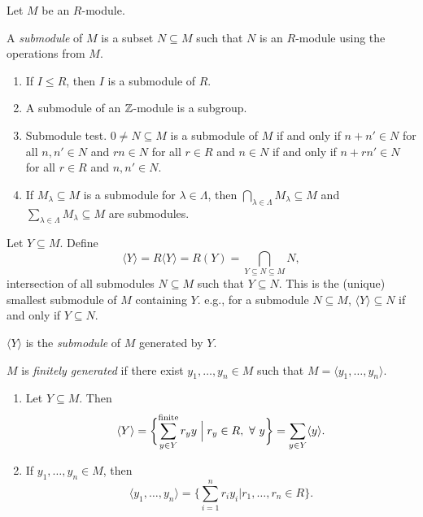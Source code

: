 \noindent Let $M$ be an $R$-module. 

\begin{definition}\label{5.3}
    A \emph{submodule} of $M$ is a subset $N \subseteq M$ such that $N$ is an $R$-module using the operations from $M$.
\end{definition}

\begin{example}\label{5.4}
    \begin{enumerate}
        \item If $I \leq R$, then $I$ is a submodule of $R$.
        \item A submodule of an $\mathbb{Z}$-module is a subgroup.
        \item Submodule test. $0 \neq N \subseteq M$ is a submodule of $M$ if and only if $n + n' \in N$ for all $n,n' \in N$ and $rn \in N$ for all $r \in R$ and $n \in N$ if and only if $n+rn' \in N$ for all $r \in R$ and $n,n' \in N$.
        \item If $M_\lambda \subseteq M$ is a submodule for $\lambda \in \Lambda$, then $\bigcap_{\lambda \in \Lambda} M_\lambda \subseteq M$ and $\sum_{\lambda \in \Lambda} M_\lambda \subseteq M$ are submodules.
    \end{enumerate}
\end{example}

\begin{definition}\label{5.5}
    Let $Y \subseteq M$. Define
    \[\langle Y \rangle = R\langle Y \rangle = R(Y) = \bigcap_{Y \subseteq N \subseteq M}N,\]
    intersection of all submodules $N \subseteq M$ such that $Y \subseteq N$. This is the (unique) smallest submodule of $M$ containing $Y$. e.g., for a submodule $N \subseteq M$, $\langle Y \rangle \subseteq N$ if and only if $Y \subseteq N$. \par
    $\langle Y \rangle$ is the \emph{submodule} of $M$ generated by $Y$. \par 
    $M$ is \emph{finitely generated} if there exist $y_1,\ldots,y_n \in M$ such that $M = \langle y_1,\ldots,y_n \rangle$. 
\end{definition}

\begin{fact}\label{5.6}
    \begin{enumerate}
        \item Let $Y \subseteq M$. Then 
            \[\langle Y \rangle = \biggl\{\sum_{y \in Y}^{\text{finite}} r_yy \mathrel{\Big |} r_y \in R, \ \forall \  y\biggr\} = \sum_{y \in Y} \langle y \rangle.\]
        \item If $y_1,\ldots,y_n \in M$, then 
            \[\langle y_1,\ldots,y_n \rangle = \biggl\{\sum_{i=1}^{n} r_iy_i \mathrel{\Big |} r_1,\ldots,r_n \in R\biggr\}.\]
    \end{enumerate}
\end{fact}

